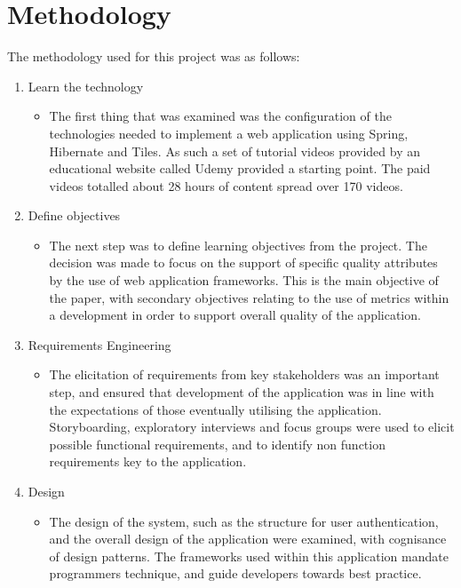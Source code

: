 \section{Methodology}

The methodology used for this project was as follows:

\begin{enumerate}
\item Learn the technology
\begin{itemize}
\item The first thing that was examined was the configuration of the technologies needed to implement a web application using Spring, Hibernate and Tiles. As such a set of tutorial videos provided by an educational website called Udemy provided a starting point. The paid videos totalled about 28 hours of content spread over 170 videos.\parencite{udemy}
\end{itemize}
\item Define objectives
\begin{itemize}
\item The next step was to define learning objectives from the project. The decision was made to focus on the support of specific quality attributes by the use of web application frameworks. This is the main objective of the paper, with secondary objectives relating to the use of metrics within a development in order to support overall quality of the application.
\end{itemize}
\item Requirements Engineering
\begin{itemize}
\item The elicitation of requirements from key stakeholders was an important step, and ensured that development of the application was in line with the expectations of those eventually utilising the application. Storyboarding, exploratory interviews and focus groups were used to elicit possible functional requirements, and to identify non function requirements key to the application.
\end{itemize}
\item Design
\begin{itemize}
\item The design of the system, such as the structure for user authentication, and the overall design of the application were examined, with cognisance of design patterns. The frameworks used within this application mandate programmers technique, and guide developers towards best practice.
\end{itemize}

\end{enumerate}
